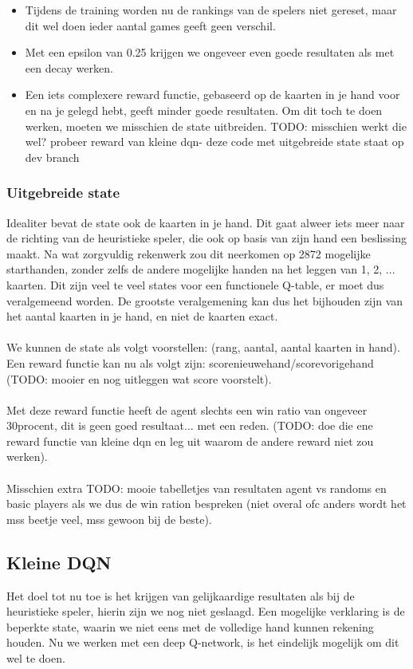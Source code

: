 \documentclass[11pt]{article}
\begin{document}
\begin{itemize}
	\item Tijdens de training worden nu de rankings van de spelers niet gereset, maar dit wel doen ieder aantal games geeft geen verschil.
	\item Met een epsilon van 0.25 krijgen we ongeveer even goede resultaten als met een decay werken.
	\item Een iets complexere reward functie, gebaseerd op de kaarten in je hand voor en na je gelegd hebt, geeft minder goede resultaten. Om dit toch te doen werken, moeten we misschien de state uitbreiden. TODO: misschien werkt die wel? probeer reward van kleine dqn- deze code met uitgebreide state staat op dev branch
\end{itemize}

\subsubsection{Uitgebreide state}
Idealiter bevat de state ook de kaarten in je hand. Dit gaat alweer iets meer naar de richting van de heuristieke speler, die ook op basis van zijn hand een beslissing maakt. Na wat zorgvuldig rekenwerk zou dit neerkomen op 2872 mogelijke starthanden, zonder zelfs de andere mogelijke handen na het leggen van 1, 2, ... kaarten. Dit zijn veel te veel states voor een functionele Q-table, er moet dus veralgemeend worden. De grootste veralgemening kan dus het bijhouden zijn van het aantal kaarten in je hand, en niet de kaarten exact.\\\\
We kunnen de state als volgt voorstellen: (rang, aantal, aantal kaarten in hand). Een reward functie kan nu als volgt zijn: scorenieuwehand/scorevorigehand (TODO: mooier en nog uitleggen wat score voorstelt).\\\\
Met deze reward functie heeft de agent slechts een win ratio van ongeveer 30procent, dit is geen goed resultaat... met een reden. (TODO: doe die ene reward functie van kleine dqn en leg uit waarom de andere reward niet zou werken).\\\\
Misschien extra TODO: mooie tabelletjes van resultaten agent vs randoms en basic players als we dus de win ration bespreken (niet overal ofc anders wordt het mss beetje veel, mss gewoon bij de beste).

\subsection{Kleine DQN}
Het doel tot nu toe is het krijgen van gelijkaardige resultaten als bij de heuristieke speler, hierin zijn we nog niet geslaagd. Een mogelijke verklaring is de beperkte state, waarin we niet eens met de volledige hand kunnen rekening houden. Nu we werken met een deep Q-network, is het eindelijk mogelijk om dit wel te doen.
\end{document}
